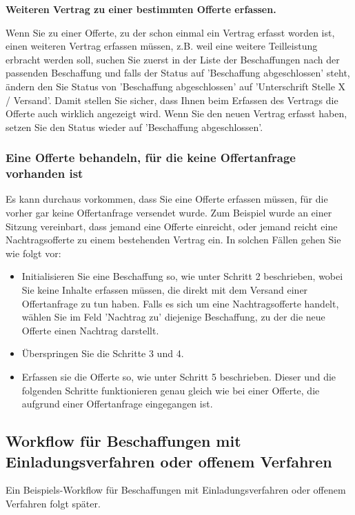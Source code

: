 \vspace{\baselineskip}

\textbf{Weiteren Vertrag zu einer bestimmten Offerte erfassen.}

Wenn Sie zu einer Offerte, zu der schon einmal ein Vertrag erfasst worden ist, einen weiteren Vertrag erfassen müssen, z.B. weil eine weitere Teilleistung erbracht werden soll, suchen Sie zuerst in der Liste der Beschaffungen nach der passenden Beschaffung und falls der Status auf 'Beschaffung abgeschlossen' steht, ändern den Sie Status von 'Beschaffung abgeschlossen' auf 'Unterschrift Stelle X / Versand'. Damit stellen Sie sicher, dass Ihnen beim Erfassen des Vertrags die Offerte auch wirklich angezeigt wird. Wenn Sie den neuen Vertrag erfasst haben, setzen Sie den Status wieder auf 'Beschaffung abgeschlossen'.

\subsubsection{Eine Offerte behandeln, für die keine Offertanfrage vorhanden ist}

Es kann durchaus vorkommen, dass Sie eine Offerte erfassen müssen, für die vorher gar keine Offertanfrage versendet wurde. Zum Beispiel wurde an einer Sitzung vereinbart, dass jemand eine Offerte einreicht, oder jemand reicht eine Nachtragsofferte zu einem bestehenden Vertrag ein. In solchen Fällen gehen Sie wie folgt vor:


\begin{itemize}
\item
Initialisieren Sie eine Beschaffung so, wie unter Schritt 2 beschrieben, wobei Sie keine Inhalte erfassen müssen, die direkt mit dem Versand einer Offertanfrage zu tun haben. Falls es sich um eine Nachtragsofferte handelt, wählen Sie im Feld 'Nachtrag zu' diejenige Beschaffung, zu der die neue Offerte einen Nachtrag darstellt.
\item
Überspringen Sie die Schritte 3 und 4.
\item
Erfassen sie die Offerte so, wie unter Schritt 5 beschrieben. Dieser und die folgenden Schritte funktionieren genau gleich wie bei einer Offerte, die aufgrund einer Offertanfrage eingegangen ist.
\end{itemize}

\subsection{Workflow für Beschaffungen mit Einladungsverfahren oder offenem Verfahren}

Ein Beispiels-Workflow für Beschaffungen mit Einladungsverfahren oder offenem Verfahren folgt später.

